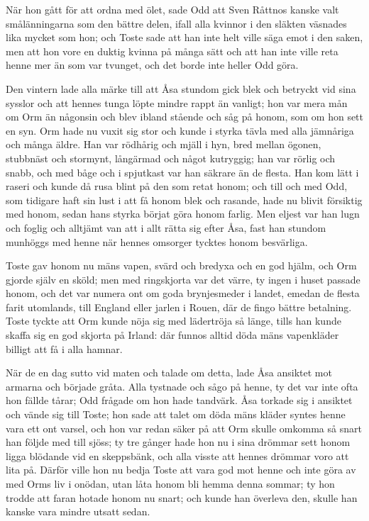 \initial När hon gått för att ordna med ölet, sade Odd att Sven Råttnos kanske valt smålänningarna som den bättre delen, ifall alla kvinnor i den släkten väsnades lika mycket som hon; och Toste sade att han inte helt ville säga emot i den saken, men att hon vore en duktig kvinna på många sätt och att han inte ville reta henne mer än som var tvunget, och det borde inte heller Odd göra.

\initial Den vintern lade alla märke till att Åsa stundom gick blek och betryckt vid sina sysslor och att hennes tunga löpte mindre rappt än vanligt; hon var mera mån om Orm än någonsin och blev ibland stående och såg på honom, som om hon sett en syn. Orm hade nu vuxit sig stor och kunde i styrka tävla med alla jämnåriga och många äldre. Han var rödhårig och mjäll i hyn, bred mellan ögonen, stubbnäst och stormynt, långärmad och något kutryggig; han var rörlig och snabb, och med båge och i spjutkast var han säkrare än de flesta. Han kom lätt i raseri och kunde då rusa blint på den som retat honom; och till och med Odd, som tidigare haft sin lust i att få honom blek och rasande, hade nu blivit försiktig med honom, sedan hans styrka börjat göra honom farlig. Men eljest var han lugn och foglig och alltjämt van att i allt rätta sig efter Åsa, fast han stundom munhöggs med henne när hennes omsorger tycktes honom besvärliga.

\initial Toste gav honom nu mäns vapen, svärd och bredyxa och en god hjälm, och Orm gjorde själv en sköld; men med ringskjorta var det värre, ty ingen i huset passade honom, och det var numera ont om goda brynjesmeder i landet, emedan de flesta farit utomlands, till England eller jarlen i Rouen, där de fingo bättre betalning. Toste tyckte att Orm kunde nöja sig med lädertröja så länge, tills han kunde skaffa sig en god skjorta på Irland: där funnos alltid döda mäns vapenkläder billigt att få i alla hamnar.

\initial När de en dag sutto vid maten och talade om detta, lade Åsa ansiktet mot armarna och började gråta. Alla tystnade och sågo på henne, ty det var inte ofta hon fällde tårar; Odd frågade om hon hade tandvärk. Åsa torkade sig i ansiktet och vände sig till Toste; hon sade att talet om döda mäns kläder syntes henne vara ett ont varsel, och hon var redan säker på att Orm skulle omkomma så snart han följde med till sjöss; ty tre gånger hade hon nu i sina drömmar sett honom ligga blödande vid en skeppsbänk, och alla visste att hennes drömmar voro att lita på. Därför ville hon nu bedja Toste att vara god mot henne och inte göra av med Orms liv i onödan, utan låta honom bli hemma denna sommar; ty hon trodde att faran hotade honom nu snart; och kunde han överleva den, skulle han kanske vara mindre utsatt sedan.

